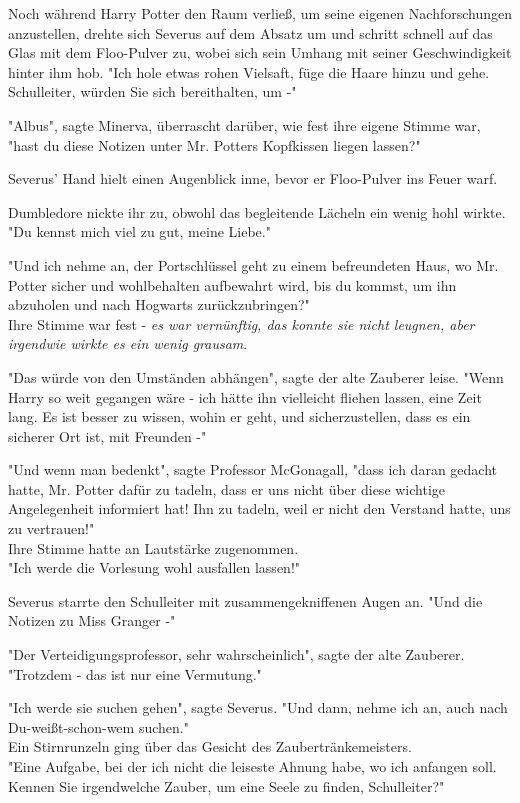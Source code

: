 {Noch während Harry Potter den Raum verließ, um seine eigenen Nachforschungen anzustellen, drehte sich Severus auf dem Absatz um und schritt schnell auf das Glas mit dem Floo-Pulver zu, wobei sich sein Umhang mit seiner Geschwindigkeit hinter ihm hob. "Ich hole etwas rohen Vielsaft, füge die Haare hinzu und gehe. Schulleiter, würden Sie sich bereithalten, um -"

"Albus", sagte Minerva, überrascht darüber, wie fest ihre eigene Stimme war, "hast du diese Notizen unter Mr. Potters Kopfkissen liegen lassen?"

Severus' Hand hielt einen Augenblick inne, bevor er Floo-Pulver ins Feuer warf.

Dumbledore nickte ihr zu, obwohl das begleitende Lächeln ein wenig hohl wirkte. "Du kennst mich viel zu gut, meine Liebe."

"Und ich nehme an, der Portschlüssel geht zu einem befreundeten Haus, wo Mr. Potter sicher und wohlbehalten aufbewahrt wird, bis du kommst, um ihn abzuholen und nach Hogwarts zurückzubringen?"\\ Ihre Stimme war fest - \emph{es war vernünftig, das konnte sie nicht leugnen, aber irgendwie wirkte es ein wenig grausam}.

"Das würde von den Umständen abhängen", sagte der alte Zauberer leise. "Wenn Harry so weit gegangen wäre - ich hätte ihn vielleicht fliehen lassen, eine Zeit lang. Es ist besser zu wissen, wohin er geht, und sicherzustellen, dass es ein sicherer Ort ist, mit Freunden -"

"Und wenn man bedenkt", sagte Professor McGonagall, "dass ich daran gedacht hatte, Mr. Potter dafür zu tadeln, dass er uns nicht über diese wichtige Angelegenheit informiert hat! Ihn zu tadeln, weil er nicht den Verstand hatte, uns zu vertrauen!"\\ Ihre Stimme hatte an Lautstärke zugenommen.\\ "Ich werde die Vorlesung wohl ausfallen lassen!"

Severus starrte den Schulleiter mit zusammengekniffenen Augen an. "Und die Notizen zu Miss Granger -"

"Der Verteidigungsprofessor, sehr wahrscheinlich", sagte der alte Zauberer. "Trotzdem - das ist nur eine Vermutung."

"Ich werde sie suchen gehen", sagte Severus. "Und dann, nehme ich an, auch nach Du-weißt-schon-wem suchen."\\ Ein Stirnrunzeln ging über das Gesicht des Zaubertränkemeisters.\\ "Eine Aufgabe, bei der ich nicht die leiseste Ahnung habe, wo ich anfangen soll. Kennen Sie irgendwelche Zauber, um eine Seele zu finden, Schulleiter?"

}
